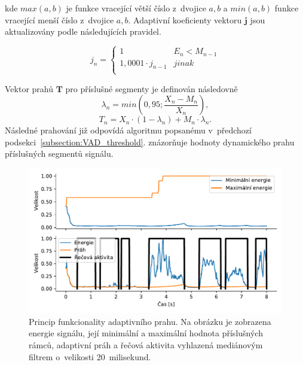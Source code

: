 kde $max(a,b)$ je funkce vracející větší číslo z~dvojice $a,b$ a $min(a,b)$ funkce vracející menší číslo z~dvojice $a,b$. Adaptivní koeficienty vektoru $\mathbf{j}$ jsou aktualizovány podle následujících pravidel.

\begin{equation}
    \label{eqn:E_dynamic_threshold_j}
    j_{n} = \begin{cases}
           1               & E_{n} < M_{n-1}\\
           1,0001 \cdot j_{n-1}               & jinak\\
    \end{cases}
\end{equation}

Vektor prahů $\mathbf{T}$ pro příslušné segmenty je definován následovně
\begin{equation}
    \label{eqn:E_dynamic_threshold_lambda}
    \lambda_{n} = min(0,95; \frac{X_{n} - M_{n}}{X_{n}}),
\end{equation}
\begin{equation}
    \label{eqn:E_dynamic_threshold_threshold}
    T_{n} = X_{n} \cdot (1-\lambda_{n}) + M_{n} \cdot \lambda_{n}.
\end{equation}
Následné prahování již odpovídá algoritmu popsanému v~předchozí podsekci~\ref{subsection:VAD_threshold}.  znázorňuje hodnoty dynamického prahu příslušných segmentů signálu.

\begin{figure}[ht]
  \centering
  \includegraphics[width=\linewidth]{obrazky-figures/vad_adaptive.pdf}
  \caption{Princip funkcionality adaptivního prahu. Na obrázku je zobrazena energie signálu, její minimální a maximální hodnota příslušných rámců, adaptivní práh a řečová aktivita vyhlazená mediánovým filtrem o~velikosti 20~milisekund.}
  \label{fig:VAD_adaptive_threshold}
\end{figure}


